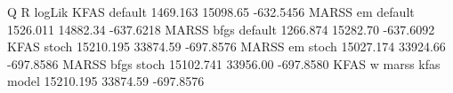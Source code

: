 \begin{Schunk}
\begin{Soutput}
                                Q        R    logLik
KFAS default             1469.163 15098.65 -632.5456
MARSS em default         1526.011 14882.34 -637.6218
MARSS bfgs default       1266.874 15282.70 -637.6092
KFAS stoch              15210.195 33874.59 -697.8576
MARSS em stoch          15027.174 33924.66 -697.8586
MARSS bfgs stoch        15102.741 33956.00 -697.8580
KFAS w marss kfas model 15210.195 33874.59 -697.8576
\end{Soutput}
\end{Schunk}
